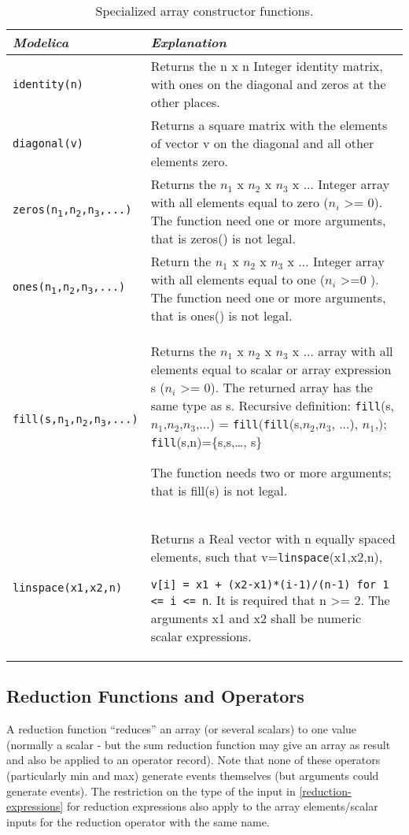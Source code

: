 \begin{longtable}[]{|l|p{11cm}|}
\caption{Specialized array constructor functions.}\\
\hline
\emph{Modelica} & \emph{Explanation}\\ \hline
\endhead
\lstinline!identity(n)!
&
Returns the n x n Integer identity matrix, with ones on the diagonal and
zeros at the other places.\\ \hline
\lstinline!diagonal(v)!
&
Returns a square matrix with the elements of vector v on the diagonal
and all other elements zero.\\ \hline
\texttt{zeros(n\textsubscript 1,n\textsubscript 2,n\textsubscript 3,...)} &
Returns the $n_1$ x $n_2$ x $n_3$ x ... Integer array with all elements equal to zero ($n_i$
\textgreater{}= 0). The function need one or more arguments, that is
zeros() is not legal.\\ \hline
\texttt{ones(n\textsubscript 1,n\textsubscript 2,n\textsubscript 3,...)} &
Return the $n_1$ x $n_2$ x $n_3$ x ... Integer array with all elements equal to one ($n_i$
\textgreater{}=0 ). The function need one or more arguments, that is
ones() is not legal.\\ \hline
\texttt{fill(s,n\textsubscript 1,n\textsubscript 2,n\textsubscript 3,...)} &
Returns the $n_1$ x $n_2$ x $n_3$ x ... array with all elements equal to scalar or array expression s
($n_i$ \textgreater{}= 0). The returned array has the same
type as s.
Recursive definition:
\lstinline!fill!(s,$n_1$,$n_2$,$n_3$,...) =
\lstinline!fill!(\lstinline!fill!(s,$n_2$,$n_3$, ...),
$n_1$,); \lstinline!fill!(s,n)=\{s,s,\ldots{}, s\}

The function needs two or more arguments; that is fill(s) is not
legal.\\ \hline
\lstinline!linspace(x1,x2,n)!
&
Returns a Real vector with n equally spaced elements, such that
v=\lstinline!linspace!(x1,x2,n),

\lstinline!v[i] = x1 + (x2-x1)*(i-1)/(n-1) for 1 <= i <= n!.
It is required that n \textgreater{}= 2. The arguments x1 and x2 shall
be numeric scalar expressions.\\ \hline
\end{longtable}

\subsection{Reduction Functions and Operators}

A reduction function ``reduces'' an array (or several scalars) to one
value (normally a scalar - but the sum reduction function may give an
array as result and also be applied to an operator record). Note that
none of these operators (particularly min and max) generate events
themselves (but arguments could generate events). The restriction on the
type of the input in \autoref{reduction-expressions} for reduction expressions also
apply to the array elements/scalar inputs for the reduction operator
with the same name.

